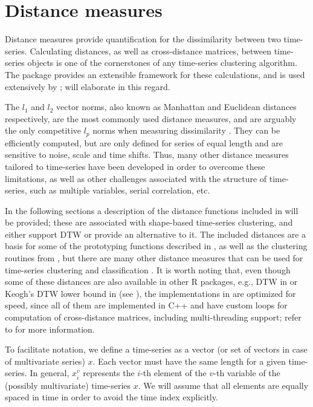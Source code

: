 \section{Distance measures}
\label{sec:distances}

Distance measures provide quantification for the dissimilarity between two time-series.
Calculating distances,
as well as cross-distance matrices,
between time-series objects is one of the cornerstones of any time-series clustering algorithm.
The  package \citep{proxy} provides an extensible framework for these calculations,
and is used extensively by \dtwclust{};
 will elaborate in this regard.

The $l_1$ and $l_2$ vector norms,
also known as Manhattan and Euclidean distances respectively,
are the most commonly used distance measures,
and are arguably the only competitive $l_p$ norms when measuring dissimilarity \citep{aggarwal2001, lemire2009}.
They can be efficiently computed,
but are only defined for series of equal length and are sensitive to noise,
scale and time shifts.
Thus, many other distance measures tailored to time-series have been developed in order to overcome these limitations,
as well as other challenges associated with the structure of time-series,
such as multiple variables,
serial correlation, etc.

In the following sections a description of the distance functions included in \dtwclust{} will be provided;
these are associated with shape-based time-series clustering,
and either support DTW or provide an alternative to it.
The included distances are a basis for some of the prototyping functions described in ,
as well as the clustering routines from ,
but there are many other distance measures that can be used for time-series clustering and classification \citep{montero2014, tsdist}.
It is worth noting that,
even though some of these distances are also available in other R packages,
e.g., DTW in  or Keogh's DTW lower bound in 
(see ),
the implementations in \dtwclust{} are optimized for speed,
since all of them are implemented in C++ and have custom loops for computation of cross-distance matrices,
including multi-threading support;
refer to  for more information.

To facilitate notation,
we define a time-series as a vector (or set of vectors in case of multivariate series) $x$.
Each vector must have the same length for a given time-series.
In general, $x^v_i$ represents the $i$-th element of the $v$-th variable of the (possibly multivariate) time-series $x$.
We will assume that all elements are equally spaced in time in order to avoid the time index explicitly.

